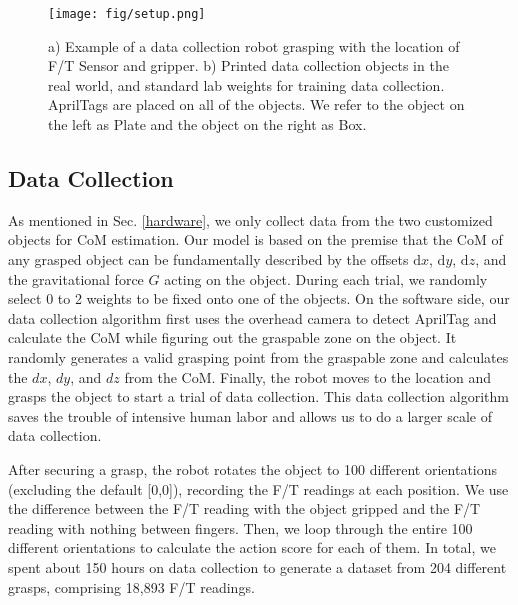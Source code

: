 \begin{figure}[htbp]
\vspace{2mm}
\begin{center}
\texttt{[image: fig/setup.png]}
\end{center}
\caption{a) Example of a data collection robot grasping with the location of F/T Sensor and gripper. b) Printed data collection objects in the real world, and standard lab weights for training data collection. AprilTags are placed on all of the objects. We refer to the object on the left as Plate and the object on the right as Box. }
\label{setup}
\vspace{-5mm}
\end{figure}

\subsection{Data Collection}

As mentioned in Sec. \ref{hardware}, we only collect data from the two customized objects for CoM estimation. Our model is based on the premise that the CoM of any grasped object can be fundamentally described by the offsets $\mathrm{d}x$, $\mathrm{d}y$, $\mathrm{d}z$, and the gravitational force $G$ acting on the object. During each trial, we randomly select 0 to 2 weights to be fixed onto one of the objects. On the software side, our data collection algorithm first uses the overhead camera to detect AprilTag and calculate the CoM while figuring out the graspable zone on the object. It randomly generates a valid grasping point from the graspable zone and calculates the $dx$, $dy$, and $dz$ from the CoM. Finally, the robot moves to the location and grasps the object to start a trial of data collection. This data collection algorithm saves the trouble of intensive human labor and allows us to do a larger scale of data collection. 

After securing a grasp, the robot rotates the object to 100 different orientations (excluding the default [0,0]), recording the F/T readings at each position. We use the difference between the F/T reading with the object gripped and the F/T reading with nothing between fingers. Then, we loop through the entire 100 different orientations to calculate the action score for each of them. In total, we spent about 150 hours on data collection to generate a dataset from 204 different grasps, comprising 18,893 F/T readings. 

